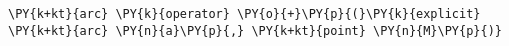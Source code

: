 \begin{Verbatim}[commandchars=\\\{\}]
    \PY{k+kt}{arc} \PY{k}{operator} \PY{o}{+}\PY{p}{(}\PY{k}{explicit} \PY{k+kt}{arc} \PY{n}{a}\PY{p}{,} \PY{k+kt}{point} \PY{n}{M}\PY{p}{)}
\end{Verbatim}
